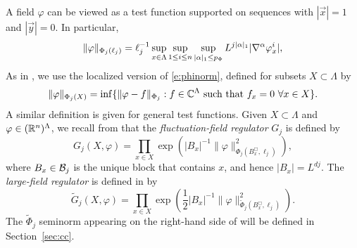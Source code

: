 A field $\varphi$ can be viewed as a test function supported on sequences with
$|\vec x| = 1$ and $|\vec y| = 0$.
In particular,
\begin{equation}
\lbeq{phinorm}
\|\varphi\|_{\Phi_j(\ell_j)}
	=
\ell_j^{-1}
\sup_{x\in \Lambda} \sup_{1\le i\le n}
\sup_{|\alpha|_1  \le p_\Phi}
L^{j|\alpha|_1}
|\nabla^{\alpha} \varphi^i_x|,
\end{equation}
As in \cite[(\ref{IE-e:PhiXdef})]{BS-rg-IE}, we use the localized version
of \eqref{e:phinorm}, defined for subsets $X \subset \Lambda$  by
\begin{equation}
\label{e:PhiXdef}
\|\varphi\|_{\Phi_j(X)}
	=
\inf
\{
	\|\varphi -f\|_{\Phi_j} :
	\text{$f \in \mathbb{C}^\Lambda$ such that $f_{x} = 0$
	$\forall x\in X$}
\}.
\end{equation}
A similar definition is given for general test functions.
Given $X \subset \Lambda$ and $\varphi \in ({\mathbb R}^n)^{\Lambda}$,
we recall from \cite[\eqref{IE-e:GPhidef}]{BS-rg-IE}
that the
\emph{fluctuation-field regulator} $G_j$
is defined by
\begin{equation}
\label{e:GPhidef}
G_j(X,\varphi)
	=
\prod_{x \in X} \exp
\left(|B_{x}|^{-1}\|\varphi\|_{\Phi_j (B_{x}^\Box,\ell_j )}^2 \right)
,
\end{equation}
where $B_{x}\in \mathcal{B}_j$ is the unique block that contains $x$,
and hence $|B_x| = L^{dj}$.
The \emph{large-field regulator} is defined in \cite[\eqref{IE-e:9Gdef}]{BS-rg-IE} by
\begin{equation}
\label{e:9Gdef}
\tilde G_j(X,\varphi)
	=
\prod_{x \in X}
\exp \left(
\frac 12 |B_{x}|^{-1}\|\varphi\|_{\tilde\Phi_j (B_{x}^\Box,\ell_j)}^2
\right)
.
\end{equation}
The $\tilde\Phi_j$ seminorm appearing on the right-hand side of  will be defined
in Section~\ref{sec:cc}.

